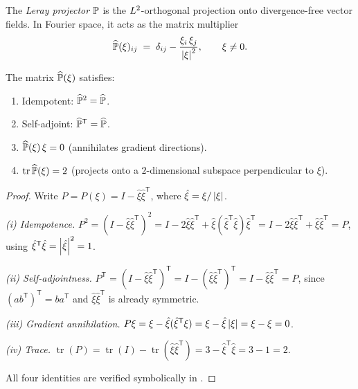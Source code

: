 \begin{definition}\label{def:leray-proj}
  The \emph{Leray projector} $\mathbb{P}$ is the $L^{2}$-orthogonal projection onto
  divergence-free vector fields.  In Fourier space, it acts as the matrix multiplier
  \begin{equation}\label{eq:leray-fourier}
    \widehat{\mathbb{P}}(\xi)_{ij}
    \;=\; \delta_{ij} - \frac{\xi_i\,\xi_j}{\left\lvert \xi \right\rvert^2},
    \qquad \xi \neq 0.
  \end{equation}
\end{definition}

\begin{proposition}\label{prop:leray-fourier-props}
  The matrix $\widehat{\mathbb{P}}(\xi)$ satisfies:
  \begin{enumerate}[label=(\roman*)]
    \item\label{it:P-idemp} Idempotent: $\widehat{\mathbb{P}}^2 = \widehat{\mathbb{P}}$.
    \item\label{it:P-sa} Self-adjoint: $\widehat{\mathbb{P}}^{\mathsf{T}} = \widehat{\mathbb{P}}$.
    \item\label{it:P-ann} $\widehat{\mathbb{P}}(\xi)\,\xi = 0$
      (annihilates gradient directions).
    \item\label{it:P-trace} $\operatorname{tr}\widehat{\mathbb{P}}(\xi) = 2$
      (projects onto a $2$-dimensional subspace perpendicular to $\xi$).
  \end{enumerate}
\end{proposition}

\begin{proof}
  Write $P = P(\xi) = I - \hat\xi\hat\xi^{\mathsf{T}}$, where
  $\hat\xi = \xi/\left\lvert \xi \right\rvert$.

  \emph{(i) Idempotence.}
  $P^2 = (I - \hat\xi\hat\xi^{\mathsf{T}})^2
       = I - 2\hat\xi\hat\xi^{\mathsf{T}} + \hat\xi(\hat\xi^{\mathsf{T}}\hat\xi)\hat\xi^{\mathsf{T}}
       = I - 2\hat\xi\hat\xi^{\mathsf{T}} + \hat\xi\hat\xi^{\mathsf{T}}
       = P$,
  using $\hat\xi^{\mathsf{T}}\hat\xi = \left\lvert \hat\xi \right\rvert^2 = 1$.

  \emph{(ii) Self-adjointness.}
  $P^{\mathsf{T}} = (I - \hat\xi\hat\xi^{\mathsf{T}})^{\mathsf{T}}
       = I - (\hat\xi\hat\xi^{\mathsf{T}})^{\mathsf{T}}
       = I - \hat\xi\hat\xi^{\mathsf{T}} = P$,
  since $(ab^{\mathsf{T}})^{\mathsf{T}} = ba^{\mathsf{T}}$ and
  $\hat\xi\hat\xi^{\mathsf{T}}$ is already symmetric.

  \emph{(iii) Gradient annihilation.}
  $P\xi = \xi - \hat\xi(\hat\xi^{\mathsf{T}}\xi)
       = \xi - \hat\xi\left\lvert \xi \right\rvert = \xi - \xi = 0$.

  \emph{(iv) Trace.}
  $\operatorname{tr}(P) = \operatorname{tr}(I) - \operatorname{tr}(\hat\xi\hat\xi^{\mathsf{T}})
       = 3 - \hat\xi^{\mathsf{T}}\hat\xi = 3 - 1 = 2$.

  \noindent All four identities are verified symbolically in .
\end{proof}

